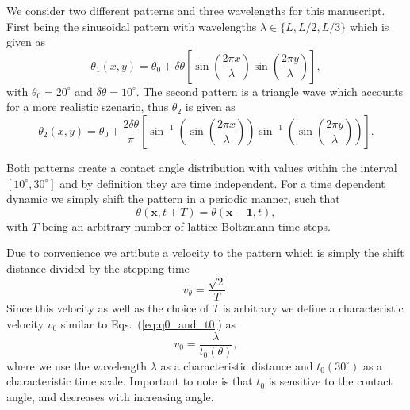 \documentclass[twocolumn,amsmath,amssymb,showpacs,pre,nofootinbib,superscriptaddress]{revtex4-1} %
\begin{document}
We consider two different patterns and three wavelengths for this manuscript.
First being the sinusoidal pattern with wavelengths $\lambda \in \{L, L/2, L/3\}$ which is given as
\begin{equation}\label{eq:sinetheta}
    \theta_1(x,y) = \theta_0 + \delta\theta\left[\sin\left(\frac{2\pi x}{\lambda}\right)\sin\left(\frac{2\pi y}{\lambda}\right)\right], 
\end{equation}
with $\theta_0 = 20^{\circ}$ and $\delta\theta=10^{\circ}$.
The second pattern is a triangle wave which accounts for a more realistic szenario, thus $\theta_2$ is given as
\begin{equation}\label{eq:triangle_wave}
    \theta_2(x,y) = \theta_0 + \frac{2\delta\theta}{\pi}\left[\sin^{-1}\left(\sin\left(\frac{2\pi x}{\lambda}\right)\right)\sin^{-1}\left(\sin\left(\frac{2\pi y}{\lambda}\right)\right)\right].
\end{equation}

Both patterns create a contact angle distribution with values within the interval $[10^{\circ}, 30^{\circ}]$ and by definition they are time independent.
For a time dependent dynamic we simply shift the pattern in a periodic manner, such that
\begin{equation}\label{eq:theta_shift}
    \theta(\mathbf{x},t+T) = \theta(\mathbf{x}-\mathbf{1}, t), 
\end{equation}
with $T$ being an arbitrary number of lattice Boltzmann time steps. 

Due to convenience we artibute a velocity to the pattern which is simply the shift distance divided by the stepping time
\begin{equation}\label{eq:pattern_speed}
    v_{\theta} = \frac{\sqrt{2}}{T}.
\end{equation}
Since this velocity as well as the choice of $T$ is arbitrary we define a characteristic velocity $v_0$ similar to Eqs.~(\ref{eq:q0_and_t0}) as
\begin{equation}\label{eq:normvel}
    v_0 = \frac{\lambda}{t_0(\theta)},
\end{equation}
where we use the wavelength $\lambda$ as a characteristic distance and $t_0(30^{\circ})$ as a characteristic time scale.
Important to note is that $t_0$ is sensitive to the contact angle, and decreases with increasing angle.
\end{document}
